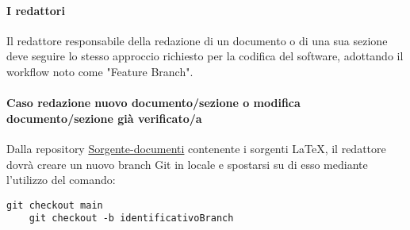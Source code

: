 


\paragraph{I redattori} 
Il redattore responsabile della redazione di un documento o di una sua sezione deve seguire lo stesso approccio richiesto per la codifica del software, adottando il workflow noto come "Feature Branch". \\

\vspace{0.1cm}

\paragraph*{\textbf{Caso redazione nuovo documento/sezione o modifica documento/sezione già verificato/a}}
Dalla repository \href{https://github.com/ByteOps-swe/Sorgente-documenti}{Sorgente-documenti} contenente i sorgenti \LaTeX, il redattore dovrà creare un nuovo branch Git in locale e spostarsi su di esso mediante l'utilizzo del comando:
\begin{lstlisting}[style=code]
    git checkout main
    git checkout -b identificativoBranch
\end{lstlisting}

